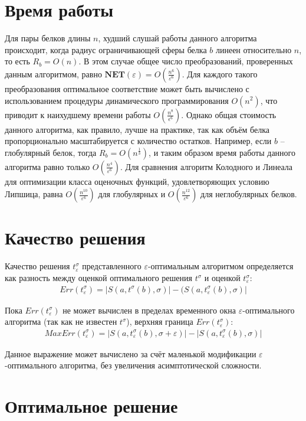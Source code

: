 \documentclass[a4paper]{extreport}
\newcommand{\lp}{\left(}
\newcommand{\rp}{\right)}
\newcommand{\eps}{\varepsilon}
\begin{document}
\section{Время работы}

Для пары белков длины $n$, худший слушай работы данного алгоритма происходит, когда радиус ограничивающей сферы белка $b$ линеен относительно $n$, то есть $R_b = O(n)$. В этом случае общее число преобразований, проверенных данным алгоритмом, равно $\mathbf{NET}(\eps) = O \lp \frac{n^6}{\eps^6} \rp$. Для каждого такого преобразования оптимальное соответствие может быть вычислено с использованием процедуры динамического программирования $O(n^2)$, что приводит к наихудшему времени работы $O \lp \frac{n^8}{\epsilon^6} \rp$.
Однако общая стоимость данного алгоритма, как правило, лучше на практике, так как объём белка пропорционально масштабируется с количество остатков. Например, если $b$ -- глобулярный белок, тогда $R_b = O(n^\frac{1}{3})$, и таким образом время работы данного алгоритма равно только $O\lp\frac{n^4}{\eps^6}\rp$.
Для сравнения алгоритм Колодного и Линеала для оптимизации класса оценочных функций, удовлетворяющих условию Липшица, равна $O \lp \frac{n^{10}}{\eps^6} \rp$ для глобулярных и $O \lp \frac{n^{12}}{\eps^6} \rp$ для неглобулярных белков.

\section{ Качество решения}

Качество решения $t_\eps^\sigma$ представленного $\eps$-оптимальным алгоритмом определяется как разность между оценкой оптимального решения $t^\sigma$ и оценкой $t_\eps^\sigma$:
\begin{gather}
Err(t_\eps^\sigma ) = |S(a, t^\sigma (b), \sigma) | - (S(a, t_\eps^\sigma (b), \sigma)|
\end{gather}

Пока $Err(t_\eps^\sigma)$ не может вычислен в пределах временного окна $\eps$-оптимального алгоритма (так как не известен $t^\sigma$), верхняя граница $Err(t_\eps^\sigma)$:
\begin{gather}
MaxErr(t_\eps^\sigma ) = |S(a, t_\eps^\sigma (b), \sigma + \eps)| - |S(a, t_\eps^\sigma(b), \sigma)|
\end{gather}

Данное выражение может вычислено за счёт маленькой модификации $\eps$-оптимального алгоритма, без увеличения асимптотической сложности.

\section{Оптимальное решение}
\end{document}
